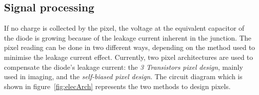     \subsection{Signal processing}

    If no charge is collected by the pixel, the voltage at the equivalent capacitor of the diode is growing because of the leakage current inherent in the junction.
    The pixel reading can be done in two different ways, depending on the method used to minimise the leakage current effect.
    Currently, two pixel architectures are used to compensate the diode's leakage current: the \textit{3 Transistors pixel design}, mainly used in imaging, and the \textit{self-biased pixel design}.
    The circuit diagram which is shown in figure~\ref{fig:elecArch} represents the two methods to design pixels.
    
